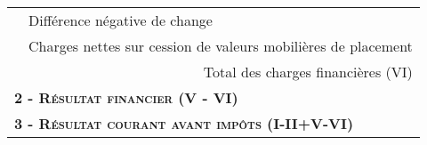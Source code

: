 \begin{table}[h]
\begin{tabular}{|l|p{6.5cm}|}
\cline{2-2}                                                                                                                                                                 
                                                                                              & Différence négative de change					                                     \\ 
\cline{2-2}                                                                                                                                                                          
                                                                                              & Charges nettes sur cession de valeurs mobilières de placement		                 \\ 
\cline{2-2}                                                                                                                                                                          
                                                                                              & \multicolumn{1}{r|}{Total des charges financières (VI)}                              \\                                                                                   
\hline                                                                                                                                                                      
 \multicolumn{2}{|l|}{\hspace{1em} \textbf{\textsc{ 2 - Résultat financier (V - VI)}}}     \\
\hline                                                                                                                                                                      
 \multicolumn{2}{|l|}{\hspace{1em} \textbf{\textsc{ 3 - Résultat courant avant impôts (I-II+V-VI)}}}  \\
\hline
\end{tabular}
\label{compteResultatPage1}
\end{table}
